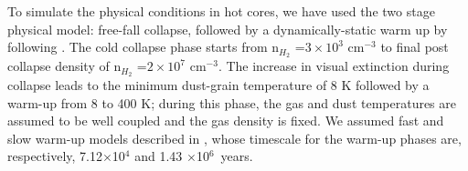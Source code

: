 \documentclass{aastex61}
\begin{document}
To simulate the physical conditions in hot cores, we have used the two stage physical model: free-fall collapse, followed by a dynamically-static warm up by following \cite{Garrod13}. The cold collapse phase starts from 
n$_{H_{2}}$ =$ 3\times10^3$ cm$^{-3}$ to final post collapse density of n$_{H_{2}}$ =$ 2\times10^7$ cm$^{-3}$. The increase in visual extinction during collapse leads to the minimum dust-grain temperature of 8 K 
followed by a warm-up from 8 to 400 K; during this phase, the gas and dust temperatures are assumed to be well coupled and the gas density is fixed. 
% 
We assumed fast and slow warm-up models described in \cite{Garrod13}, whose timescale for the warm-up phases are, respectively, 7.12$\times$10$^{4}$ and 1.43 $\times$10$^{6}$~years.
%









 
\end{document}
